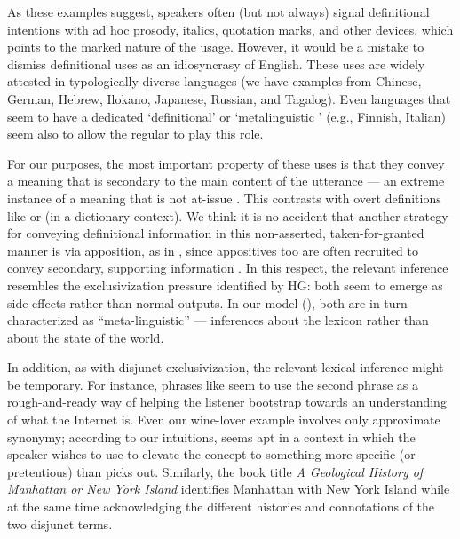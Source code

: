\documentclass[12pt,twoside]{article}
\renewcommand{\_}{\textbf{\textunderscore\hspace{-4pt}\textunderscore\hspace{-3pt}\textunderscore\hspace{-4pt}\textunderscore}\hspace{0.5pt}}			%
\begin{document}
As these examples suggest, speakers often (but not always) signal
definitional intentions with ad hoc prosody, italics, quotation marks,
and other devices, which points to the marked nature of the
usage. However, it would be a mistake to dismiss definitional uses as
an idiosyncrasy of English. These uses are widely attested in
typologically diverse languages (we have examples from Chinese,
German, Hebrew, Ilokano, Japanese, Russian, and Tagalog). Even
languages that seem to have a dedicated `definitional' or
`metalinguistic ' (e.g., Finnish, Italian) seem also to allow
the regular  to play this role.

For our purposes, the most important property of these uses is that
they convey a meaning that is secondary to the main content of the
utterance --- an extreme instance of a meaning that is not at-issue
\citep{Tonhauser-etal:2011,Dillon-etal:2014}. This contrasts with
overt definitions like  or
 (in a dictionary context).  We think it
is no accident that another strategy for conveying definitional
information in this non-asserted, taken-for-granted manner is via
apposition, as in , since appositives
too are often recruited to convey secondary, supporting information
\citep{Potts05BOOK,Potts08HSK,Syrett-etal:2014}. In this respect, the
relevant inference resembles the exclusivization pressure identified
by HG: both seem to emerge as side-effects rather than normal
outputs. In our model (), both are in turn
characterized as ``meta-linguistic'' --- inferences about the lexicon
rather than about the state of the world.

In addition, as with disjunct exclusivization, the relevant lexical
inference might be temporary. For instance, phrases like
 seem to use the second phrase as a
rough-and-ready way of helping the listener bootstrap towards an
understanding of what the Internet is. Even our wine-lover example
involves only approximate synonymy; according to our intuitions,
 seems apt in a context in which the
speaker wishes to use  to elevate the concept to
something more specific (or pretentious) than  picks
out. Similarly, the book title \emph{A Geological History of Manhattan
  or New York Island} identifies Manhattan with New York Island while
at the same time acknowledging the different histories and
connotations of the two disjunct terms.
\end{document}
